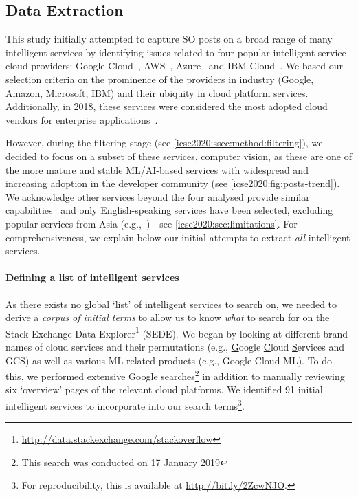 \subsection{Data Extraction}

This study initially attempted to capture SO posts on a broad range of many intelligent services by identifying issues related to four popular intelligent service cloud providers: Google Cloud~, AWS~, Azure~ and IBM Cloud~.
We based our selection criteria on the prominence of the providers in industry (Google, Amazon, Microsoft, IBM) and their ubiquity in cloud platform services. Additionally, in 2018, these services were considered the most adopted cloud vendors for enterprise applications~\citep{RightScaleInc:2018kJ}.

However, during the filtering stage (see \cref{icse2020:ssec:method:filtering}), we decided to focus on a subset of these services, computer vision, as these are one of the more mature and stable ML/AI-based services with widespread and increasing adoption in the developer community (see \cref{icse2020:fig:posts-trend}). We acknowledge other services beyond the four analysed provide similar capabilities~ and only English-speaking services have been selected, excluding popular services from Asia (e.g.,~)---see \cref{icse2020:sec:limitations}. For comprehensiveness, we explain below our initial attempts to extract \textit{all} intelligent services. %

\paragraph{Defining a list of intelligent services}
As there exists no global `list' of intelligent services to search on, we needed to derive a \textit{corpus of initial terms} to allow us to know \textit{what} to search for on the Stack Exchange Data Explorer\footnote{\url{http://data.stackexchange.com/stackoverflow}} (SEDE). We began by looking at different brand names of cloud services and their permutations (e.g., \underline{G}oogle \underline{C}loud \underline{S}ervices and GCS) as well as various ML-related products (e.g., Google Cloud ML). To do this, we performed extensive Google searches\footnote{This search was conducted on 17 January 2019}\def\footnotesearchdate{2} in addition to manually reviewing six `overview' pages of the relevant cloud platforms. We identified 91 initial intelligent services to incorporate into our search terms\footnote{For reproducibility, this is available at \url{http://bit.ly/2ZcwNJO}.}.\def\footnotereproducability{3} 

